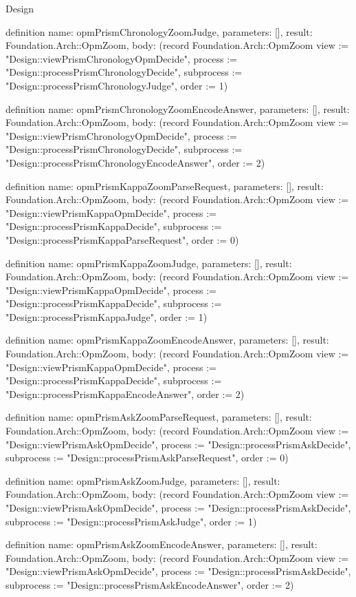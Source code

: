\begin{lexlean}{Design}
\begin{semanticmodule}
definition{
  name: opmPrismChronologyZoomJudge,
  parameters: [],
  result: Foundation.Arch::OpmZoom,
  body: (record Foundation.Arch::OpmZoom {view := "Design::viewPrismChronologyOpmDecide", process := "Design::processPrismChronologyDecide", subprocess := "Design::processPrismChronologyJudge", order := 1})
}

definition{
  name: opmPrismChronologyZoomEncodeAnswer,
  parameters: [],
  result: Foundation.Arch::OpmZoom,
  body: (record Foundation.Arch::OpmZoom {view := "Design::viewPrismChronologyOpmDecide", process := "Design::processPrismChronologyDecide", subprocess := "Design::processPrismChronologyEncodeAnswer", order := 2})
}

definition{
  name: opmPrismKappaZoomParseRequest,
  parameters: [],
  result: Foundation.Arch::OpmZoom,
  body: (record Foundation.Arch::OpmZoom {view := "Design::viewPrismKappaOpmDecide", process := "Design::processPrismKappaDecide", subprocess := "Design::processPrismKappaParseRequest", order := 0})
}

definition{
  name: opmPrismKappaZoomJudge,
  parameters: [],
  result: Foundation.Arch::OpmZoom,
  body: (record Foundation.Arch::OpmZoom {view := "Design::viewPrismKappaOpmDecide", process := "Design::processPrismKappaDecide", subprocess := "Design::processPrismKappaJudge", order := 1})
}

definition{
  name: opmPrismKappaZoomEncodeAnswer,
  parameters: [],
  result: Foundation.Arch::OpmZoom,
  body: (record Foundation.Arch::OpmZoom {view := "Design::viewPrismKappaOpmDecide", process := "Design::processPrismKappaDecide", subprocess := "Design::processPrismKappaEncodeAnswer", order := 2})
}

definition{
  name: opmPrismAskZoomParseRequest,
  parameters: [],
  result: Foundation.Arch::OpmZoom,
  body: (record Foundation.Arch::OpmZoom {view := "Design::viewPrismAskOpmDecide", process := "Design::processPrismAskDecide", subprocess := "Design::processPrismAskParseRequest", order := 0})
}

definition{
  name: opmPrismAskZoomJudge,
  parameters: [],
  result: Foundation.Arch::OpmZoom,
  body: (record Foundation.Arch::OpmZoom {view := "Design::viewPrismAskOpmDecide", process := "Design::processPrismAskDecide", subprocess := "Design::processPrismAskJudge", order := 1})
}

definition{
  name: opmPrismAskZoomEncodeAnswer,
  parameters: [],
  result: Foundation.Arch::OpmZoom,
  body: (record Foundation.Arch::OpmZoom {view := "Design::viewPrismAskOpmDecide", process := "Design::processPrismAskDecide", subprocess := "Design::processPrismAskEncodeAnswer", order := 2})
}


\end{semanticmodule}
\end{lexlean}
